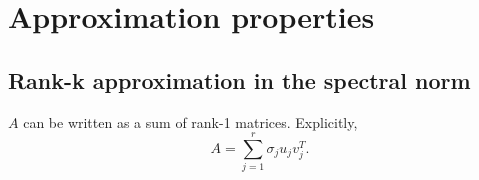\documentclass{article}
\begin{document}

\section{Approximation properties}

\subsection{Rank-k approximation in the spectral norm}

\begin{lemma}\label{rank 1 approx}
$A$ can be written as a sum of rank-1 matrices. Explicitly,
\begin{equation*}
A = \sum_{j=1}^{r} \sigma_{j} u_{j} v_{j}^{T}.
\end{equation*}
\end{lemma}
\end{document}
